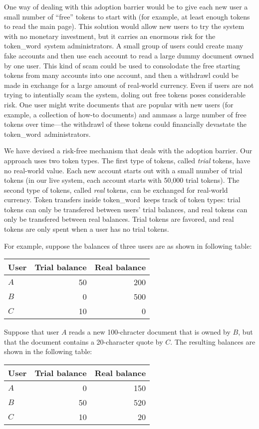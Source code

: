 \documentclass{acm_proc_article-sp}
\newcommand{\tw}{token\_word}
\begin{document}
One way of dealing with this adoption barrier would be to give each new user a small number of ``free'' tokens to start with (for example, at least enough tokens to read the main page).
This solution would allow new users to try the system with no monetary investment, but it carries an enormous risk for the \tw \  system administrators.
A small group of users could create many fake accounts and then use each account to read a large dummy document owned by one user.
This kind of scam could be used to consolodate the free starting tokens from many accounts into one account, and then a withdrawl could be made in exchange for a large amount of real-world currency.
Even if users are not trying to intentially scam the system, doling out free tokens poses considerable risk.
One user might write documents that are popular with new users (for example, a collection of how-to documents) and ammass a large number of free tokens over time---the withdrawl of these tokens could financially devastate the \tw \  administrators.

We have devised a risk-free mechanism that deals with the adoption barrier.  
Our approach uses two token types.
The first type of tokens, called {\it trial} tokens, have no real-world value.
Each new account starts out with a small number of trial tokens (in our live system, each account starts with 50,000 trial tokens).
The second type of tokens, called {\it real} tokens, can be exchanged for real-world currency.
Token transfers inside \tw \  keeps track of token types:  trial tokens can only be transfered between users' trial balances, and real tokens can only be transfered between real balances.
Trial tokens are favored, and real tokens are only spent when a user has no trial tokens.

For example, suppose the balances of three users are as shown in following table:
\begin{center}
\begin{tabular}{|l||r|r|}
\hline
User&Trial balance &Real balance\\
\hline
$A$&50 &200\\
\hline
$B$&0  &500\\
\hline
$C$&10 &0  \\
\hline
\end{tabular}
\end{center}
Suppose that user $A$ reads a new 100-chracter document that is owned by $B$, but that the document contains a 20-character quote by $C$.
The resulting balances are shown in the following table:
\begin{center}
\begin{tabular}{|l||r|r|}
\hline
User&Trial balance &Real balance\\
\hline
$A$&0 &150\\
\hline
$B$&50  &520\\
\hline
$C$&10 &20  \\
\hline
\end{tabular}
\end{center}
\end{document}
